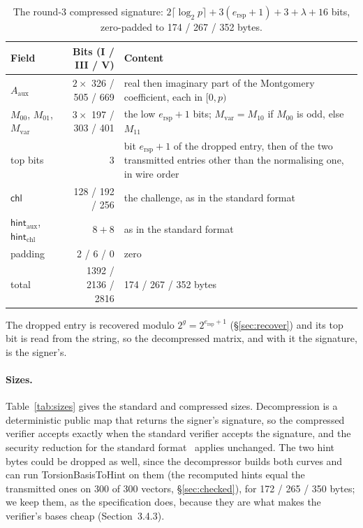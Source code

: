 \documentclass[version=preprint,notanonymous]{iacrcc}
\newcommand{\ers}{e_{\mathrm{rsp}}}
\begin{document}
\begin{table}[H]
\centering
\caption{The round-3 compressed signature: $2 \lceil \log_2 p \rceil + 3
(\ers + 1) + 3 + \lambda + 16$ bits, zero-padded to 174 / 267 / 352 bytes.}
\label{tab:layout3}
\footnotesize
\begin{tabular}{l r p{5.6cm}}
\toprule
\textbf{Field} & \textbf{Bits (I / III / V)} & \textbf{Content} \\
\midrule
$A_{\mathrm{aux}}$ & $2 \times$ 326 / 505 / 669 & real then imaginary part of the Montgomery coefficient, each in $[0, p)$ \\
$M_{00}$, $M_{01}$, $M_{\mathrm{var}}$ & $3 \times$ 197 / 303 / 401 & the low $\ers + 1$ bits; $M_{\mathrm{var}} = M_{10}$ if $M_{00}$ is odd, else $M_{11}$ \\
top bits & 3 & bit $\ers + 1$ of the dropped entry, then of the two transmitted entries other than the normalising one, in wire order \\
$\mathsf{chl}$ & 128 / 192 / 256 & the challenge, as in the standard format \\
$\mathsf{hint}_{\mathrm{aux}}$, $\mathsf{hint}_{\mathrm{chl}}$ & $8 + 8$ & as in the standard format \\
padding & 2 / 6 / 0 & zero \\
\midrule
total & 1392 / 2136 / 2816 & 174 / 267 / 352 bytes \\
\bottomrule
\end{tabular}
\end{table}

The dropped entry is recovered modulo $2^g = 2^{\ers + 1}$
(\S\ref{sec:recover}) and its top bit is read from the string, so the
decompressed matrix, and with it the signature, is the signer's.

\paragraph{Sizes.}
Table~\ref{tab:sizes} gives the standard and compressed sizes.
Decompression is a deterministic public map that returns the signer's
signature, so the compressed verifier accepts exactly when the standard
verifier accepts the signature, and the security reduction for the
standard format~\cite{sqisign-security} applies unchanged. The two hint
bytes could be dropped as well, since the decompressor builds both curves
and can run TorsionBasisToHint on them (the recomputed hints equal the
transmitted ones on 300 of 300 vectors, \S\ref{sec:checked}), for 172 /
265 / 350 bytes; we keep them, as the specification does, because they
are what makes the verifier's bases cheap (Section~3.4.3).
\end{document}
